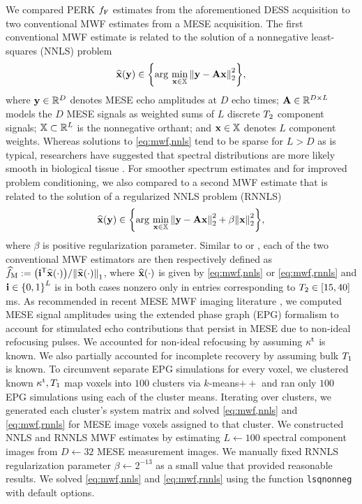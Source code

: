 We compared PERK $f_{\mathrm{F}}$ estimates
from the aforementioned DESS acquisition
to two conventional MWF estimates
from a MESE acquisition.
The first conventional MWF estimate \cite{mackay:94:ivv}
is related to the solution
of a nonnegative least-squares (NNLS) problem \cite{lawson:74}
\begin{align}
	\esta{\bmx}{\bmy} \in \set{\argmin{\bmx \in \setX} \norm{\bmy - \bmA \bmx}_2^2},
	\label{eq:mwf,nnls}
\end{align}
where $\mathbf{y} \in \mathbb{R}^{D}$ denotes 
MESE echo amplitudes at $D$ echo times;
$\mathbf{A} \in \mathbb{R}^{D \times L}$ models the $D$ MESE signals
as weighted sums of $L$ discrete $T_2$ component signals;
$\mathbb{X} \subset \mathbb{R}^{L}$ is the nonnegative orthant;
and
$\mathbf{x} \in \mathbb{X}$ denotes $L$ component weights.
Whereas solutions to \eqref{eq:mwf,nnls} tend to be sparse
for $L>D$ as is typical,
researchers have suggested
that spectral distributions are more likely smooth
in biological tissue \cite{kroeker:86:aob}.
For smoother \invivo spectrum estimates 
and for improved problem conditioning,
we also compared 
to a second MWF estimate \cite{whittall:89:qio}
that is related to the solution
of a regularized NNLS problem (RNNLS)
\begin{align}
	\esta{\bmx}{\bmy} \in \set{\argmin{\bmx \in \setX} \norm{\bmy - \bmA \bmx}_2^2
		+ \beta \norm{\bmx}_2^2},
	\label{eq:mwf,rnnls}
\end{align}
where $\beta$ is positive regularization parameter.
Similar to \cite{mackay:94:ivv} or \cite{whittall:89:qio},
each of the two conventional MWF estimators 
are then respectively defined as 
$\mwfest := \paren{\bmi\tpose \esta{\bmx}{\cdot}}/\norm{\esta{\bmx}{\cdot}}_1$,
where $\esta{\bmx}{\cdot}$ is given
by \eqref{eq:mwf,nnls} or \eqref{eq:mwf,rnnls}
and $\bmi \in \set{0,1}^L$ is in both cases nonzero
only in entries corresponding to $\Tt \in \brac{15,40}$ms.
As recommended in recent MESE MWF imaging literature \cite{prasloski:12:aos},
we computed MESE signal amplitudes
using the extended phase graph (EPG) formalism \cite{hennig:88:mis}
to account for stimulated echo contributions
that persist in MESE due to non-ideal refocusing pulses.
We accounted for non-ideal refocusing
by assuming $\kappa^{\mathrm{t}}$ is known. 
We also partially accounted for incomplete recovery
by assuming bulk $T_1$ is known. 
To circumvent separate EPG simulations for every voxel,
we clustered known $\kappa^{\mathrm{t}},T_1$ map voxels
into $100$ clusters via $k$-means$++$ \cite{arthur:07:kmt}
and ran only $100$ EPG simulations 
using each of the cluster means.
Iterating over clusters,
we generated each cluster's system matrix 
and solved \eqref{eq:mwf,nnls} and \eqref{eq:mwf,rnnls} 
for MESE image voxels assigned to that cluster.
We constructed NNLS and RNNLS MWF estimates
by estimating $L \gets 100$ spectral component images
from $D \gets 32$ MESE measurement images.
We manually fixed RNNLS regularization parameter $\beta \gets 2^{-13}$
as a small value that provided reasonable \invivo results.
We solved \eqref{eq:mwf,nnls} and \eqref{eq:mwf,rnnls}
using the \matlab function \texttt{lsqnonneg} 
with default options.

